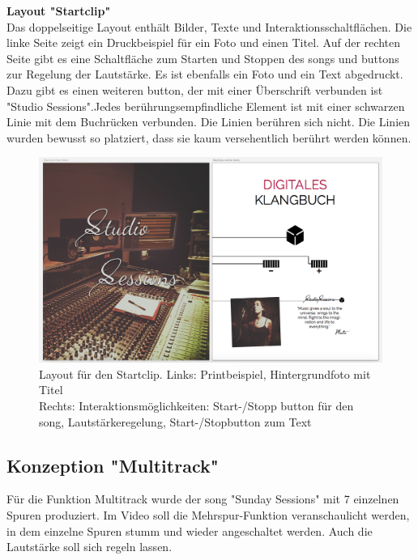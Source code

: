 \vspace{0.5cm}



\textbf{Layout "Startclip"}\\
Das doppelseitige Layout enthält Bilder, Texte und Interaktionsschaltflächen. Die linke Seite zeigt ein Druckbeispiel für ein Foto und einen Titel. Auf der rechten Seite gibt es eine Schaltfläche zum Starten und Stoppen des \gls{song}s und \gls{button}s zur Regelung der Lautstärke. Es ist ebenfalls ein Foto und ein Text abgedruckt. Dazu gibt es einen weiteren \gls{button}, der mit einer Überschrift verbunden ist "Studio Sessions".Jedes berührungsempfindliche Element ist mit einer schwarzen Linie mit dem Buchrücken verbunden. Die Linien berühren sich nicht. Die Linien wurden bewusst so platziert, dass sie kaum versehentlich berührt werden können.


\begin{figure}[H]
\centering
\includegraphics[width=1.0\textwidth]{grafiken/startclip.png}
\caption{Layout für den Startclip. Links: Printbeispiel, Hintergrundfoto mit Titel\\Rechts: Interaktionsmöglichkeiten: Start-/Stopp \gls{button} für den \gls{song}, Lautstärkeregelung, Start-/Stopbutton zum Text}
\label{fig:startclip}
\end{figure}


\vspace{0.5cm}








\subsection{Konzeption "Multitrack"}
Für die Funktion Multitrack wurde der \gls{song} "Sunday Sessions" mit 7 einzelnen Spuren produziert. Im Video soll die Mehrspur-Funktion veranschaulicht werden, in dem einzelne Spuren stumm und wieder angeschaltet werden. Auch die Lautstärke soll sich regeln lassen.\\

